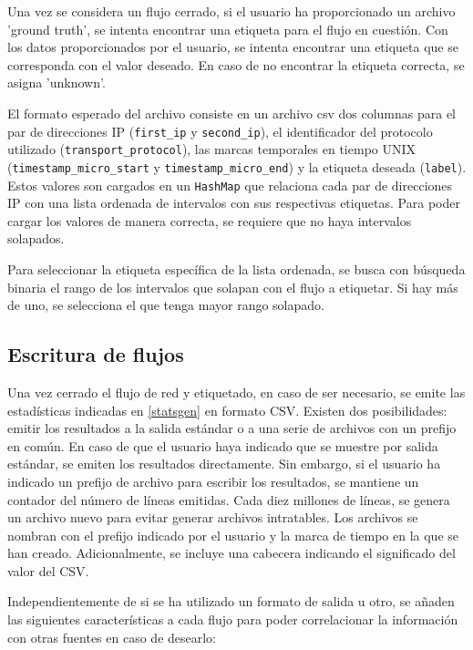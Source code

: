 Una vez se considera un flujo cerrado, si el usuario ha proporcionado un archivo 'ground truth', se intenta encontrar una etiqueta para el flujo en cuestión. Con los datos proporcionados por el usuario, se intenta encontrar una etiqueta que se corresponda con el valor deseado. En caso de no encontrar la etiqueta correcta, se asigna 'unknown'.

El formato esperado del archivo consiste en un archivo \acrshort{csv} dos columnas para el par de direcciones IP (\texttt{first\_\-ip} y \texttt{second\_\-ip}), el identificador del protocolo utilizado (\texttt{transport\_\-protocol}), las marcas temporales en tiempo UNIX (\texttt{timestamp\_\-micro\_\-start} y \texttt{timestamp\_\-micro\_\-end}) y la etiqueta deseada (\texttt{label}). Estos valores son cargados en un \texttt{HashMap} que relaciona cada par de direcciones IP con una lista ordenada de intervalos con sus respectivas etiquetas. Para poder cargar los valores de manera correcta, se requiere que no haya intervalos solapados.

Para seleccionar la etiqueta específica de la lista ordenada, se busca con búsqueda binaria el rango de los intervalos que solapan con el flujo a etiquetar. Si hay más de uno, se selecciona el que tenga mayor rango solapado.

\subsection{Escritura de flujos} \label{flowwrite}

Una vez cerrado el flujo de red y etiquetado, en caso de ser necesario, se emite las estadísticas indicadas en \ref{statsgen} en formato CSV. Existen dos posibilidades: emitir los resultados a la salida estándar o a una serie de archivos con un prefijo en común. En caso de que el usuario haya indicado que se muestre por salida estándar, se emiten los resultados directamente. Sin embargo, si el usuario ha indicado un prefijo de archivo para escribir los resultados, se mantiene un contador del número de líneas emitidas. Cada diez millones de líneas, se genera un archivo nuevo para evitar generar archivos intratables. Los archivos se nombran con el prefijo indicado por el usuario y la marca de tiempo en la que se han creado. Adicionalmente, se incluye una cabecera indicando el significado del valor del CSV.

Independientemente de si se ha utilizado un formato de salida u otro, se añaden las siguientes características a cada flujo para poder correlacionar la información con otras fuentes en caso de desearlo:

